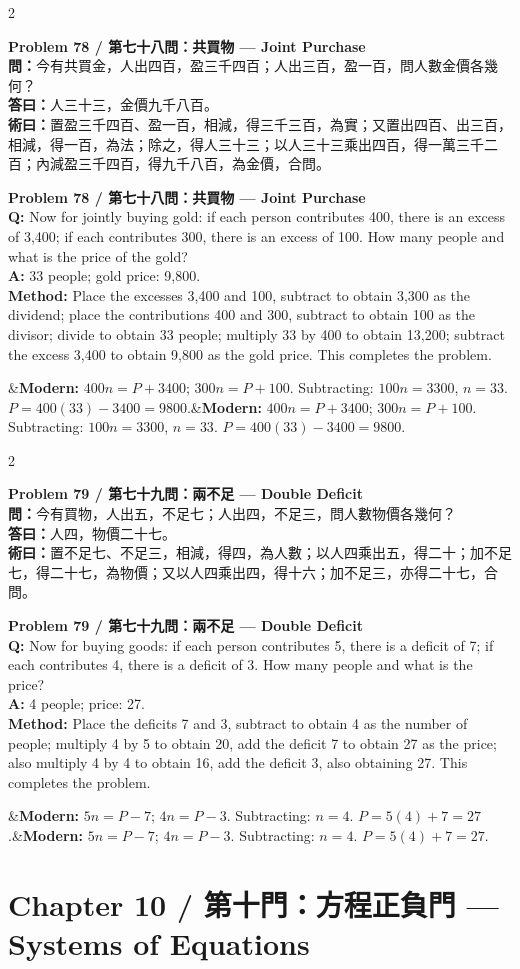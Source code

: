 \documentclass[11pt,a4paper]{article}
\newcommand{\bilingualproblem}[4]{%
  \begin{paracol}{2}
  \begin{leftcolumn}
  \noindent\textbf{\color{problemcolor}#1}\\[0.2cm]
  #2
  \end{leftcolumn}
  \switchcolumn
  \noindent\textbf{\color{problemcolor}#1}\\[0.2cm]
  #3
  \end{paracol}
  \ifx&#4&\else\vspace{0.3cm}\noindent#4\fi
  \vspace{0.5cm}
}
\newcommand{\wen}[1]{\textcolor{problemcolor}{\textbf{問：}}#1}
\newcommand{\da}[1]{\textcolor{answercolor}{\textbf{答曰：}}#1}
\newcommand{\shu}[1]{\textcolor{methodcolor}{\textbf{術曰：}}#1}
\newcommand{\wenen}[1]{\textcolor{problemcolor}{\textbf{Q:}} #1}
\newcommand{\daen}[1]{\textcolor{answercolor}{\textbf{A:}} #1}
\newcommand{\shuen}[1]{\textcolor{methodcolor}{\textbf{Method:}} #1}
\begin{document}
\bilingualproblem{Problem 78 / 第七十八問：共買物 --- Joint Purchase}{
\wen{今有共買金，人出四百，盈三千四百；人出三百，盈一百，問人數金價各幾何？}\\[0.2cm]
\da{人三十三，金價九千八百。}\\[0.2cm]
\shu{置盈三千四百、盈一百，相減，得三千三百，為實；又置出四百、出三百，相減，得一百，為法；除之，得人三十三；以人三十三乘出四百，得一萬三千二百；內減盈三千四百，得九千八百，為金價，合問。}
}{
\wenen{Now for jointly buying gold: if each person contributes 400, there is an excess of 3,400; if each contributes 300, there is an excess of 100. How many people and what is the price of the gold?}\\[0.2cm]
\daen{33 people; gold price: 9,800.}\\[0.2cm]
\shuen{Place the excesses 3,400 and 100, subtract to obtain 3,300 as the dividend; place the contributions 400 and 300, subtract to obtain 100 as the divisor; divide to obtain 33 people; multiply 33 by 400 to obtain 13,200; subtract the excess 3,400 to obtain 9,800 as the gold price. This completes the problem.}
}{\textbf{Modern:} $400n = P + 3400$; $300n = P + 100$. Subtracting: $100n = 3300$, $n = 33$. $P = 400(33) - 3400 = 9800$.}

\bilingualproblem{Problem 79 / 第七十九問：兩不足 --- Double Deficit}{
\wen{今有買物，人出五，不足七；人出四，不足三，問人數物價各幾何？}\\[0.2cm]
\da{人四，物價二十七。}\\[0.2cm]
\shu{置不足七、不足三，相減，得四，為人數；以人四乘出五，得二十；加不足七，得二十七，為物價；又以人四乘出四，得十六；加不足三，亦得二十七，合問。}
}{
\wenen{Now for buying goods: if each person contributes 5, there is a deficit of 7; if each contributes 4, there is a deficit of 3. How many people and what is the price?}\\[0.2cm]
\daen{4 people; price: 27.}\\[0.2cm]
\shuen{Place the deficits 7 and 3, subtract to obtain 4 as the number of people; multiply 4 by 5 to obtain 20, add the deficit 7 to obtain 27 as the price; also multiply 4 by 4 to obtain 16, add the deficit 3, also obtaining 27. This completes the problem.}
}{\textbf{Modern:} $5n = P - 7$; $4n = P - 3$. Subtracting: $n = 4$. $P = 5(4) + 7 = 27$.}

\newpage

\section{Chapter 10 / 第十門：方程正負門 --- Systems of Equations}
\label{sec:fangcheng}
\end{document}
